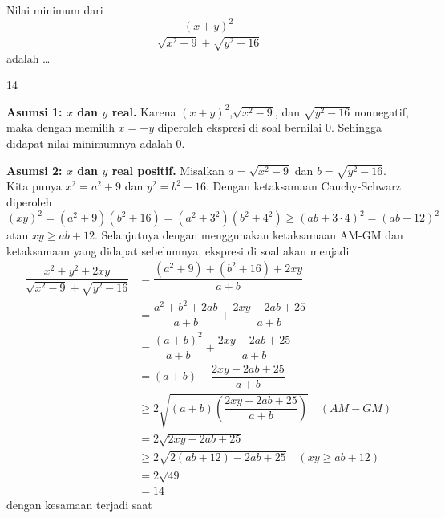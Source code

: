 \begin{soalbaru}
Nilai minimum dari
$$\dfrac{(x+y)^2}{\sqrt{x^2-9}+\sqrt{y^2-16}}$$
adalah \dots
\end{soalbaru}
\begin{jawaban}
14
\end{jawaban}
\begin{solusi}
\textbf{Asumsi 1: $x$ dan $y$ real.} Karena $(x+y)^2$,$\sqrt{x^2-9}$, dan $\sqrt{y^2-16}$ nonnegatif, maka dengan memilih $x=-y$ diperoleh ekspresi di soal bernilai 0. Sehingga didapat nilai minimumnya adalah 0.

\textbf{Asumsi 2: $x$ dan $y$ real positif.} Misalkan $a = \sqrt{x^2-9}$ dan $b = \sqrt{y^2-16}$. Kita punya $x^2 = a^2 + 9$ dan $y^2 = b^2 + 16$. Dengan ketaksamaan Cauchy-Schwarz diperoleh
$$(xy)^2 = (a^2+9)(b^2+16) = (a^2+3^2)(b^2+4^2) \ge (ab+3\cdot 4)^2 = (ab+12)^2 $$
atau $xy \ge ab+12$. Selanjutnya dengan menggunakan ketaksamaan AM-GM dan ketaksamaan yang didapat sebelumnya, ekspresi di soal akan menjadi
\begin{align*}
\dfrac{x^2+y^2+2xy}{\sqrt{x^2-9}+\sqrt{y^2-16}}&=\dfrac{(a^2+9)+(b^2+16)+2xy}{a+b}\\
&=\dfrac{a^2+b^2+2ab}{a+b}+\dfrac{2xy-2ab+25}{a+b}\\
&=\dfrac{(a+b)^2}{a+b}+\dfrac{2xy-2ab+25}{a+b}\\
&=(a+b)+\dfrac{2xy-2ab+25}{a+b}\\
&\ge 2\sqrt{(a+b)\left(\dfrac{2xy-2ab+25}{a+b}\right)} \quad (AM-GM)\\
&= 2\sqrt{2xy-2ab+25}\\
&\ge 2\sqrt{2(ab+12)-2ab+25} \quad (xy \ge ab+12)\\
&= 2\sqrt{49}\\
&= \boxed{14}
\end{align*}
dengan kesamaan terjadi saat
\end{solusi}

